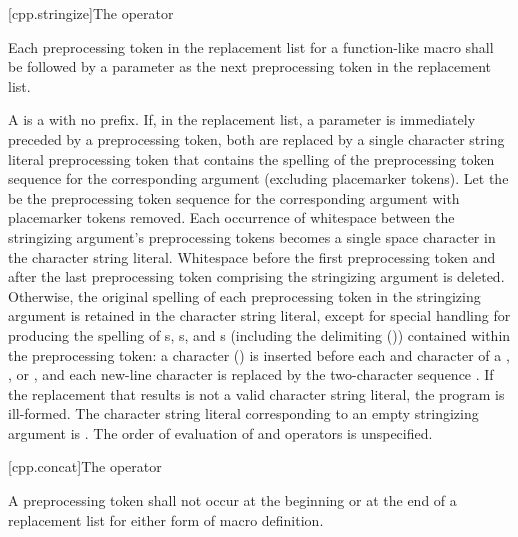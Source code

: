 [cpp.stringize]{The \tcode{\#} operator}%
%

\pnum
Each
\tcode{\#}
preprocessing token in the replacement list for a function-like
macro shall be followed by a parameter as the next preprocessing
token in the replacement list.

\pnum
A  is a  with no prefix.
If, in the replacement list, a parameter is immediately
preceded by a
\tcode{\#}
preprocessing token,
both are replaced by a single character string literal preprocessing token that
contains the spelling of the preprocessing token sequence for the
corresponding argument (excluding placemarker tokens).
Let the  be the preprocessing token sequence
for the corresponding argument with placemarker tokens removed.
Each occurrence of whitespace between the stringizing argument's preprocessing
tokens becomes a single space character in the character string literal.
Whitespace before the first preprocessing token and after the last
preprocessing token comprising the stringizing argument is deleted.
Otherwise, the original spelling of each preprocessing token in the
stringizing argument is retained in the character string literal,
except for special handling for producing the spelling of
s,
s,
and s
(including the delimiting  ())
contained within the preprocessing token:
a  character (\tcode{\textbackslash})
is inserted before each  and
 character of a
,
,
or ,
and each new-line character is
replaced by the two-character sequence .
If the replacement that results is not a valid character string literal,
the program is ill-formed.
The character string literal corresponding to
an empty stringizing argument is .
The order of evaluation of
\tcode{\#}
and
\tcode{\#\#}
operators is unspecified.

[cpp.concat]{The \tcode{\#\#} operator}%
%

\pnum
A
\tcode{\#\#}
preprocessing token shall not occur at the beginning or
at the end of a replacement list for either form
of macro definition.

